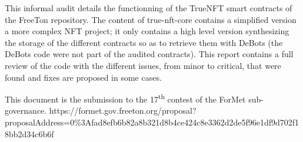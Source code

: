 This informal audit details the functionning of the TrueNFT smart contracts of the 
FreeTon repository.
%
The content of true-nft-core contains a simplified version a more complex NFT
project; it only contains a high level version synthesizing the storage of the different
contracts so as to retrieve them with DeBots (the DeBots code were not part of the 
audited contracts).
%
This report contains a full review of the code with the different issues, from 
minor to critical, that were found and fixes are proposed in some cases.

This document is the submission to the 17\textsuperscript{th} contest of the ForMet sub-governance.
https://formet.gov.freeton.org/proposal?proposalAddress=0\%3Afad8efb6b82a8b321d8b4ce424c8e3362d2de5f96e1df9d702f18bb2d34c6b6f
%
